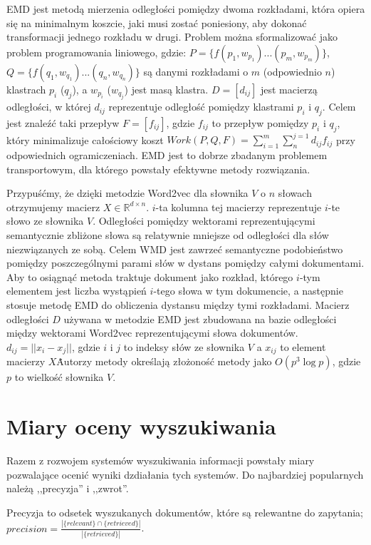 \documentclass[pl]{minipw} %
\begin{document}
EMD jest metodą mierzenia odległości pomiędzy dwoma rozkładami, która opiera się na minimalnym koszcie, jaki musi zostać poniesiony, aby dokonać transformacji jednego rozkładu w drugi. Problem można sformalizować jako problem programowania liniowego, gdzie:
$P=\{f(p_1,w_{p_1})...(p_m,w_{p_m})\}$, $Q=\{f(q_1,w_{q_1})...(q_n,w_{q_n})\}$ są danymi rozkładami o $m$ (odpowiednio $n$) klastrach $p_i$ ($q_j$), a $w_{p_i}$ ($w_{q_j}$) jest masą klastra. $D=[d_{ij}]$ jest macierzą odległości, w której $d_{ij}$ reprezentuje odległość pomiędzy klastrami $p_i$ i $q_j$. Celem jest znaleźć taki przepływ $F = [f_{ij}]$, gdzie $f_{ij}$ to przepływ pomiędzy $p_i$ i $q_j$, który minimalizuje całościowy koszt $Work(P, Q, F) = \sum_{i=1}^{m}\sum_{n}^{j=1}d_{ij}f_{ij}$ przy odpowiednich ogramiczeniach\cite{emd}.
EMD jest to dobrze zbadanym problemem transportowym\cite{emd}, dla którego powstały efektywne metody rozwiązania\cite{emd_method}. 

Przypuśćmy, że dzięki metodzie Word2vec dla słownika $V$ o $n$ słowach otrzymujemy macierz $X \in \mathbb{R}^{d \times n}$. $i$-ta kolumna tej macierzy reprezentuje $i$-te słowo ze słownika $V$. Odległości pomiędzy wektorami reprezentującymi semantycznie zbliżone słowa są relatywnie mniejsze od odległości dla słów niezwiązanych ze sobą. Celem WMD jest zawrzeć semantyczne podobieństwo pomiędzy poszczególnymi parami słów w dystans pomiędzy całymi dokumentami. Aby to osiągnąć metoda traktuje dokument jako rozkład, którego $i$-tym elementem jest liczba wystąpień $i$-tego słowa w tym dokumencie, a następnie stosuje metodę EMD do obliczenia dystansu między tymi rozkładami. Macierz odległości $D$ używana w metodzie EMD jest zbudowana na bazie odległości między wektorami Word2vec reprezentującymi słowa dokumentów. $d_{ij} = ||x_i-x_j||$, gdzie $i$ i $j$ to indeksy słów ze słownika $V$ a $x_{ij}$ to element macierzy $X$\. Autorzy metody określają złożoność metody jako $O(p^3\log p)$, gdzie $p$ to wielkość słownika $V$.

\section{Miary oceny wyszukiwania}

Razem z rozwojem systemów wyszukiwania informacji powstały miary pozwalające ocenić wyniki dzdiałania tych systemów. Do najbardziej popularnych należą ,,precyzja'' i ,,zwrot''.

Precyzja to odsetek wyszukanych dokumentów, które są relewantne do zapytania; $precision=\frac{|\{relevant\} \cap \{retrieved\}|}{|\{retrieved\}|}$.
\end{document}
